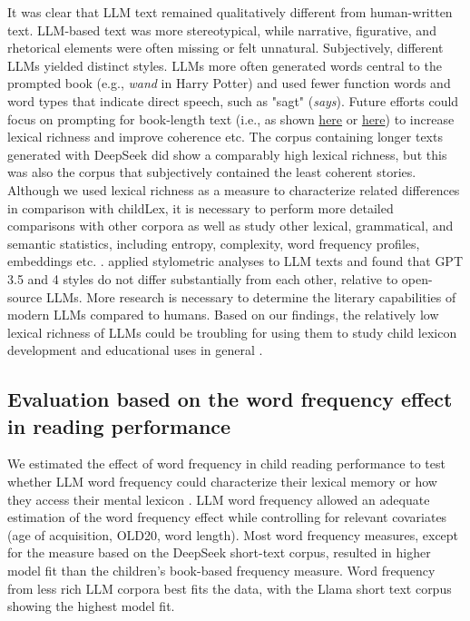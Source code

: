 \documentclass[doc, a4paper, anonymous]{apa7}
\begin{document}
It was clear that LLM text remained qualitatively different from human-written text. LLM-based text was more stereotypical, while narrative, figurative, and rhetorical elements were often missing or felt unnatural. Subjectively, different LLMs yielded distinct styles. LLMs more often generated words central to the prompted book (e.g., \textit{wand} in Harry Potter) and used fewer function words and word types that indicate direct speech, such as "sagt" (\textit{says}). Future efforts could focus on prompting for book-length text (i.e., as shown \href{https://medium.com/@baen2810/ai-assisted-writing-of-a-book-cataclysm-67788412fb31}{here} or \href{https://eqbench.com/creative_writing_longform.html}{here}) to increase lexical richness and improve coherence etc. The corpus containing longer texts generated with DeepSeek did show a comparably high lexical richness, but this was also the corpus that subjectively contained the least coherent stories. Although we used lexical richness as a measure to characterize related differences in comparison with childLex, it is necessary to perform more detailed comparisons with other corpora as well as study other lexical, grammatical, and semantic statistics, including entropy, complexity, word frequency profiles, embeddings etc. \citep{hu_language_2024, dentella_systematic_2023, munoz-ortiz_contrasting_2024, wu_survey_2024}. \citet{kumarage_neural_2023} applied stylometric analyses to LLM texts and found that GPT 3.5 and 4 styles do not differ substantially from each other, relative to open-source LLMs. More research is necessary to determine the literary capabilities of modern LLMs compared to humans. Based on our findings, the relatively low lexical richness of LLMs could be troubling for using them to study child lexicon development \citep{korochkina_morphology_2025} and educational uses in general \citep[see also ][]{kasneci_chatgpt_2023}.



\subsection*{Evaluation based on the word frequency effect in reading performance}

We estimated the effect of word frequency in child reading performance to test whether LLM word frequency could characterize their lexical memory or how they access their mental lexicon \citep{brysbaert_word_2018, brysbaert_word_2011}. LLM word frequency allowed an adequate estimation of the word frequency effect while controlling for relevant covariates (age of acquisition, OLD20, word length). Most word frequency measures, except for the measure based on the DeepSeek short-text corpus, resulted in higher model fit than the children's book-based frequency measure. Word frequency from less rich LLM corpora best fits the data, with the Llama short text corpus showing the highest model fit. 
\end{document}
